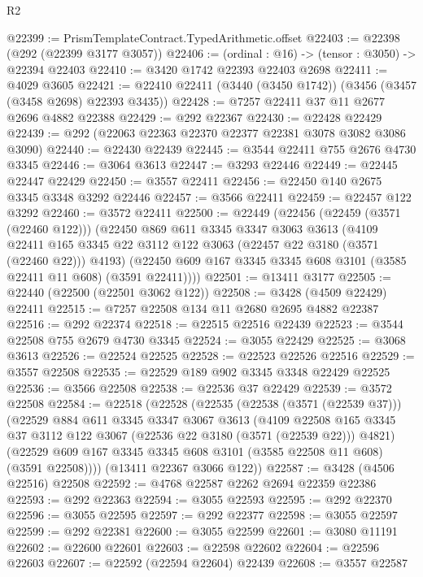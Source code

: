 \begin{lexlean}{R2}
\begin{coremodule}
@22399 := PrismTemplateContract.TypedArithmetic.offset
@22403 := @22398 (@292 (@22399 @3177 @3057))
@22406 := (ordinal : @16) -> (tensor : @3050) -> @22394 @22403
@22410 := @3420 @1742 @22393 @22403 @2698
@22411 := @4029 @3605
@22421 := @22410 @22411 (@3440 (@3450 @1742)) (@3456 (@3457 (@3458 @2698) @22393 @3435))
@22428 := @7257 @22411 @37 @11 @2677 @2696 @4882 @22388
@22429 := @292 @22367
@22430 := @22428 @22429
@22439 := @292 (@22063 @22363 @22370 @22377 @22381 @3078 @3082 @3086 @3090)
@22440 := @22430 @22439
@22445 := @3544 @22411 @755 @2676 @4730 @3345
@22446 := @3064 @3613
@22447 := @3293 @22446
@22449 := @22445 @22447 @22429
@22450 := @3557 @22411
@22456 := @22450 @140 @2675 @3345 @3348 @3292 @22446
@22457 := @3566 @22411
@22459 := @22457 @122 @3292
@22460 := @3572 @22411
@22500 := @22449
    (@22456
      (@22459 (@3571 (@22460 @122)))
      (@22450
        @869
        @611
        @3345
        @3347
        @3063
        @3613
        (@4109 @22411 @165 @3345 @22 @3112 @122 @3063 (@22457 @22 @3180 (@3571 (@22460 @22))) @4193)
        (@22450 @609 @167 @3345 @3345 @608 @3101 (@3585 @22411 @11 @608) (@3591 @22411))))
@22501 := @13411 @3177
@22505 := @22440 (@22500 (@22501 @3062 @122))
@22508 := @3428 (@4509 @22429) @22411
@22515 := @7257 @22508 @134 @11 @2680 @2695 @4882 @22387
@22516 := @292 @22374
@22518 := @22515 @22516 @22439
@22523 := @3544 @22508 @755 @2679 @4730 @3345
@22524 := @3055 @22429
@22525 := @3068 @3613
@22526 := @22524 @22525
@22528 := @22523 @22526 @22516
@22529 := @3557 @22508
@22535 := @22529 @189 @902 @3345 @3348 @22429 @22525
@22536 := @3566 @22508
@22538 := @22536 @37 @22429
@22539 := @3572 @22508
@22584 := @22518
    (@22528
      (@22535
        (@22538 (@3571 (@22539 @37)))
        (@22529
          @884
          @611
          @3345
          @3347
          @3067
          @3613
          (@4109
            @22508
            @165
            @3345
            @37
            @3112
            @122
            @3067
            (@22536 @22 @3180 (@3571 (@22539 @22)))
            @4821)
          (@22529 @609 @167 @3345 @3345 @608 @3101 (@3585 @22508 @11 @608) (@3591 @22508))))
      (@13411 @22367 @3066 @122))
@22587 := @3428 (@4506 @22516) @22508
@22592 := @4768 @22587 @2262 @2694 @22359 @22386
@22593 := @292 @22363
@22594 := @3055 @22593
@22595 := @292 @22370
@22596 := @3055 @22595
@22597 := @292 @22377
@22598 := @3055 @22597
@22599 := @292 @22381
@22600 := @3055 @22599
@22601 := @3080 @11191
@22602 := @22600 @22601
@22603 := @22598 @22602
@22604 := @22596 @22603
@22607 := @22592 (@22594 @22604) @22439
@22608 := @3557 @22587

\end{coremodule}
\end{lexlean}
